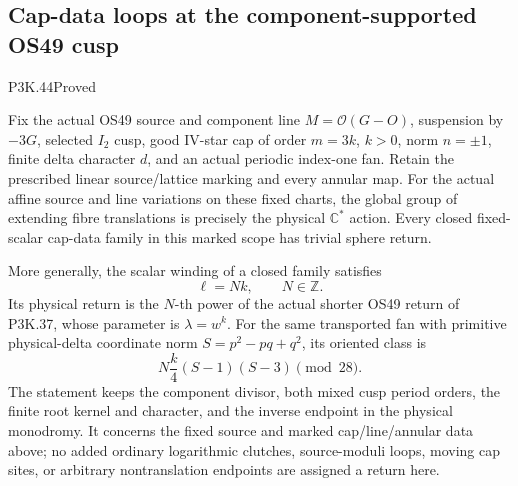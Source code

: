 \subsection{Cap-data loops at the component-supported OS49 cusp}
\begin{statement}{P3K.44}{Proved}

Fix the actual OS49 source and component line
\(M=\mathcal O(G-O)\), suspension by \(-3G\), selected
\(I_2\) cusp, good IV-star cap of order \(m=3k\), \(k>0\),
norm \(n=\pm1\), finite delta character \(d\), and an actual
periodic index-one fan. Retain the prescribed linear source/lattice
marking and every annular map. For the actual affine source and line
variations on these fixed charts, the global group of extending fibre
translations is precisely the physical \(\mathbb C^*\) action.
Every closed fixed-scalar cap-data family in this marked scope has
trivial sphere return.

More generally, the scalar winding of a closed family satisfies
\[
                          \ell=Nk,\qquad N\in\mathbb Z.
\]
Its physical return is the \(N\)-th power of the actual shorter
OS49 return of P3K.37, whose parameter is \(\lambda=w^k\).
For the same transported fan with primitive physical-delta coordinate
norm \(S=p^2-pq+q^2\), its oriented class is
\[
                       N\frac{k}{4}(S-1)(S-3)\pmod{28}.
\]
The statement keeps the component divisor, both mixed cusp period
orders, the finite root kernel and character, and the inverse endpoint
in the physical monodromy. It concerns the fixed source and marked
cap/line/annular data above; no added ordinary logarithmic clutches,
source-moduli loops, moving cap sites, or arbitrary nontranslation
endpoints are assigned a return here.

\end{statement}
